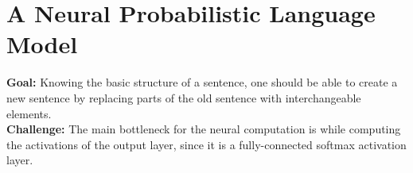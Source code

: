 \documentclass[11pt,a4paper]{article}
\begin{document}


\section{A Neural Probabilistic Language Model} %
\label{sec:a_neural_probabilistic_language_model}

  \textbf{Goal:}
  Knowing the basic structure of a sentence, one should be able to create a new sentence by replacing parts of the old sentence with interchangeable elements\cite{bengio2003neural}.\\

  \textbf{Challenge:}
  The main bottleneck for the neural computation is while computing the activations of the output layer, since it is a fully-connected softmax activation layer. \\
\end{document}
